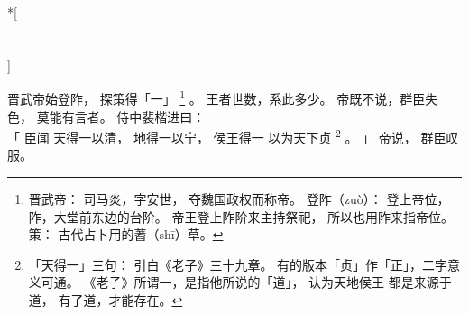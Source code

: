 
\switchcolumn[0]*[\section{}]

晋武帝始登阼，
探策得「一」%
\footnote{%
    晋武帝：
        司马炎，字安世，
        夺魏国政权而称帝。
    登阼（zuò）：
        登上帝位，
        阼，大堂前东边的台阶。
        帝王登上阼阶来主持祭祀，
        所以也用阼来指帝位。
    策：
        古代占卜用的蓍（shī）草。
}%
。
王者世数，系此多少。
帝既不说，群臣失色，
莫能有言者。
侍中裴楷进曰：\\「
    臣闻
    天得一以清，
    地得一以宁，
    侯王得一
    以为天下贞%
    \footnote{%
        「天得一」三句：
            引白《老子》三十九章。
            有的版本「贞」作「正」，二字意义可通。
            《老子》所谓一，是指他所说的「道」，
            认为天地侯王
            都是来源于道，
            有了道，才能存在。
    }%
    。
」
帝说，
群臣叹服。

\switchcolumn


